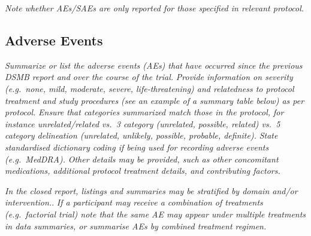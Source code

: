 \documentclass[
  11pt,
]{article}
\begin{document}
\emph{Note whether AEs/SAEs are only reported for those specified in relevant protocol.}

\hypertarget{adverse-events}{%
\subsection{Adverse Events}\label{adverse-events}}

\emph{Summarize or list the adverse events (AEs) that have occurred since the previous DSMB report and over the course of the trial.}
\emph{Provide information on severity (e.g.~none, mild, moderate, severe, life-threatening) and relatedness to protocol treatment and study procedures (see an example of a summary table below) as per protocol.}
\emph{Ensure that categories summarized match those in the protocol, for instance unrelated/related vs.~3 category (unrelated, possible, related) vs.~5 category delineation (unrelated, unlikely, possible, probable, definite).}
\emph{State standardised dictionary coding if being used for recording adverse events (e.g.~MedDRA).}
\emph{Other details may be provided, such as other concomitant medications, additional protocol treatment details, and contributing factors.}

\emph{In the closed report, listings and summaries may be stratified by domain and/or intervention.}.
\emph{If a participant may receive a combination of treatments (e.g.~factorial trial) note that the same AE may appear under multiple treatments in data summaries, or summarise AEs by combined treatment regimen.}
\end{document}
